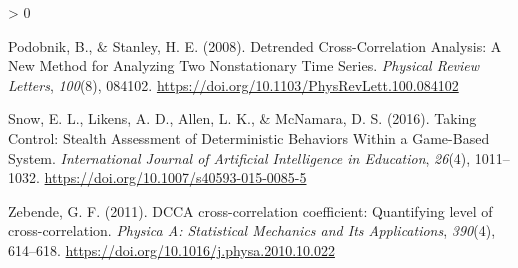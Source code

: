 \documentclass[
  english,
  man]{apa6}
\newlength{\cslhangindent}
\newenvironment{CSLReferences}[2] %
 {%
  \setlength{\parindent}{0pt}
  \ifodd #1 \everypar{\setlength{\hangindent}{\cslhangindent}}\ignorespaces\fi
  \ifnum #2 > 0
  \setlength{\parskip}{#2\baselineskip}
  \fi
 }%
 {}
\begin{document}
\begin{CSLReferences}{1}{0}
\leavevmode\hypertarget{ref-podobnikDetrendedCrossCorrelationAnalysis2008}{}%
Podobnik, B., \& Stanley, H. E. (2008). Detrended {Cross}-{Correlation} {Analysis}: {A} {New} {Method} for {Analyzing} {Two} {Nonstationary} {Time} {Series}. \emph{Physical Review Letters}, \emph{100}(8), 084102. \url{https://doi.org/10.1103/PhysRevLett.100.084102}

\leavevmode\hypertarget{ref-snow2016}{}%
Snow, E. L., Likens, A. D., Allen, L. K., \& McNamara, D. S. (2016). Taking Control: Stealth Assessment of Deterministic Behaviors Within a Game-Based System. \emph{International Journal of Artificial Intelligence in Education}, \emph{26}(4), 1011--1032. \url{https://doi.org/10.1007/s40593-015-0085-5}

\leavevmode\hypertarget{ref-zebendeDCCACrosscorrelationCoefficient2011}{}%
Zebende, G. F. (2011). {DCCA} cross-correlation coefficient: {Quantifying} level of cross-correlation. \emph{Physica A: Statistical Mechanics and Its Applications}, \emph{390}(4), 614--618. \url{https://doi.org/10.1016/j.physa.2010.10.022}

\end{CSLReferences}

\endgroup
\end{document}
